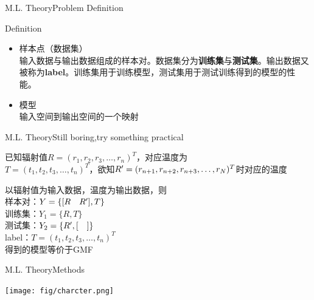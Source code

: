\documentclass{beamer}
\begin{document}

\begin{frame}{M.L. Theory}{\quad \quad\quad Problem Definition}
 \begin{block}{Definition}
   \begin{itemize}
  \item 样本点（数据集）\\输入数据与输出数据组成的样本对。数据集分为\textbf {训练集}与\textbf{测试集}。输出数据又被称为\textbf {label}。训练集用于训练模型，测试集用于测试训练得到的模型的性能。
  \item 模型\\输入空间到输出空间的一个映射
  \end{itemize}
  \end{block}
  \end{frame}

\begin{frame}[fragile]{M.L. Theory}{\quad \quad\quad Still boring,try something practical}
\begin{block}{}
已知辐射值$R=( r_1,r_2,r_3,\ldots , r_n )^T$，对应温度为\\
$T=(t_1,t_2,t_3,\ldots , t_n )^T$，欲知$R\rq{}=( r_{n+1},r_{n+2},r_{n+3},\ldots , r_N )^T$时对应的温度\\
\end{block}
以辐射值为输入数据，温度为输出数据，则\\样本对：$Y=\{[R \quad R\rq{}],T\}$ \\ 训练集：$Y_1=\{R,T\}$ \\ 测试集：$Y_2=\{R\rq{},[ \quad ]\}$\\label：$T=(t_1,t_2,t_3,\ldots , t_n )^T$\\
得到的模型等价于GMF

\end{frame}

\begin{frame}{M.L. Theory}{\quad \quad\quad Methods}

\texttt{[image: fig/charcter.png]}

\end{frame}
\end{document}
